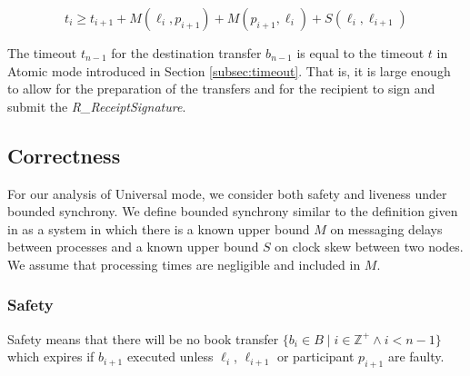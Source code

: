 \documentclass[letterpaper,twocolumn,10pt]{article}
\begin{document}
\begin{equation}
\label{eq:expiration-delta}
t_i \geq t_{i+1} + M(\ell_i, p_{i+1}) + M(p_{i+1}, \ell_i) + S(\ell_i, \ell_{i+1})
\end{equation}

The timeout $t_{n-1}$ for the destination transfer $b_{n-1}$ is equal to the timeout $t$ in Atomic mode introduced in Section \ref{subsec:timeout}. That is, it is large enough to allow for the preparation of the transfers and for the recipient to sign and submit the \textit{R\_ReceiptSignature}.





\subsection{Correctness}


For our analysis of Universal mode, we consider both safety and liveness under bounded synchrony. We define bounded synchrony similar to the definition given in \cite{dwork1988consensus} as a system in which there is a known upper bound $M$ on messaging delays between processes and a known upper bound $S$ on clock skew between two nodes. We assume that processing times are negligible and included in $M$.

\subsubsection{Safety}


Safety means that there will be no book transfer $ \{ b_i \in B \mid i \in \mathbb{Z}^+ \land i < n-1 \} $ which expires if $b_{i+1}$ executed unless $\ell_i$, $\ell_{i+1}$ or participant $p_{i+1}$ are faulty.
\end{document}
